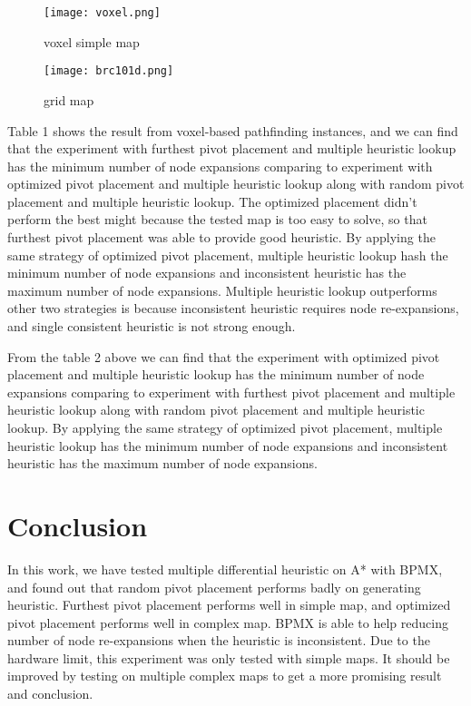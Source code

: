 \documentclass[twocolumn]{article}
\begin{document}
\begin{figure}[h]
\caption{voxel simple map}
\centering
\texttt{[image: voxel.png]}
\end{figure}

\begin{figure}[h]
\caption{grid map}
\centering
\texttt{[image: brc101d.png]}
\end{figure}

Table 1 shows the result from voxel-based pathfinding instances, and we can find that the experiment with furthest pivot placement and multiple heuristic lookup has the minimum number of node expansions comparing to experiment with optimized pivot placement and multiple heuristic lookup along with random pivot placement and multiple heuristic lookup. The optimized placement didn't perform the best might because the tested map is too easy to solve, so that furthest pivot placement was able to provide good heuristic. By applying the same strategy of optimized pivot placement, multiple heuristic lookup hash the minimum number of node expansions and inconsistent heuristic has the maximum number of node expansions. Multiple heuristic lookup outperforms other two strategies is because inconsistent heuristic requires node re-expansions, and single consistent heuristic is not strong enough.


From the table 2 above we can find that the experiment with optimized pivot placement and multiple heuristic lookup has the minimum number of node expansions comparing to experiment with furthest pivot placement and multiple heuristic lookup along with random pivot placement and multiple heuristic lookup. By applying the same strategy of optimized pivot placement, multiple heuristic lookup has the minimum number of node expansions and inconsistent heuristic has the maximum number of node expansions. 

\section{Conclusion}

In this work, we have tested multiple differential heuristic on A* with BPMX, and found out that random pivot placement performs badly on generating heuristic. Furthest pivot placement performs well in simple map, and optimized pivot placement performs well in complex map. BPMX is able to help reducing number of node re-expansions when the heuristic is inconsistent. Due to the hardware limit, this experiment was only tested with simple maps. It should be improved by testing on multiple complex maps to get a more promising result and conclusion.
\end{document}
